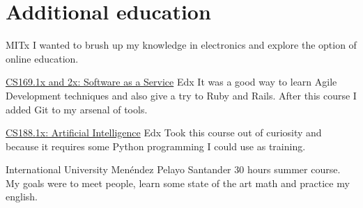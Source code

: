 \documentclass[11pt,a4paper,roman]{moderncv}
\begin{document}

\section{Additional education}


	{MITx}
	{}
	{}
	{I wanted to brush up my knowledge in electronics and explore the option of online education.} 

	{\href{https://www.edx.org/courses/BerkeleyX/CS169.1x/2013_Spring/about}
	{CS169.1x and 2x: Software as a Service}}
	{Edx}
	{}
	{}
	{It was a good way to learn Agile Development techniques and also give a try to Ruby and Rails. After this course I added Git to my arsenal of tools.} 

	{\href{https://6002x.mitx.mit.edu/}
	{CS188.1x: Artificial Intelligence}}
	{Edx}
	{}
	{}
	{Took this course out of curiosity and because it requires some Python programming I could use as training.} 



	{International University Men\'endez Pelayo}
	{Santander}
	{}
	{30 hours summer course. My goals were to meet people, learn some state of the art math and practice my english.}
\end{document}
